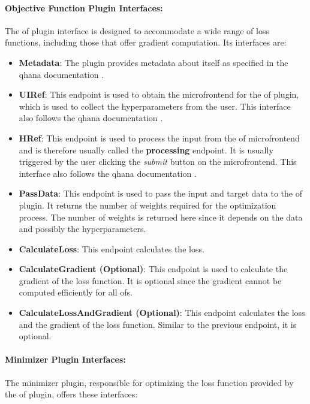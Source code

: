 \documentclass[
  a4paper,  %
  twoside,  %
  bibliography=totoc,
  headsepline,
  cleardoublepage=empty,
  parskip=half,
  draft=false
]{scrbook}
\begin{document}
\paragraph{Objective Function Plugin Interfaces:}

The \gls{of} plugin interface is designed to accommodate a wide range of loss functions, including those that offer gradient computation.
Its interfaces are:

\begin{itemize}
\item \textbf{Metadata}: The plugin provides metadata about itself as specified in the \gls{qhana} documentation \cite{FabianBuehler}.
\item \textbf{UIRef}: This endpoint is used to obtain the microfrontend for the \gls{of} plugin, which is used to collect the hyperparameters from the user.
This interface also follows the \gls{qhana} documentation \cite{FabianBuehler}.
\item \textbf{HRef}: This endpoint is used to process the input from the \gls{of} microfrontend and is therefore usually called the \textbf{processing} endpoint.
It is usually triggered by the user clicking the \emph{submit} button on the microfrontend.
This interface also follows the \gls{qhana} documentation \cite{FabianBuehler}.
\item \textbf{PassData}: This endpoint is used to pass the input and target data to the \gls{of} plugin.
It returns the number of weights required for the optimization process.
The number of weights is returned here since it depends on the data and possibly the hyperparameters.
\item \textbf{CalculateLoss}: This endpoint calculates the loss.
\item \textbf{CalculateGradient (Optional)}: This endpoint is used to calculate the gradient of the loss function. It is optional since the gradient cannot be computed efficiently for all \glspl{of}.
\item \textbf{CalculateLossAndGradient (Optional)}: This endpoint calculates the loss and the gradient of the loss function. Similar to the previous endpoint, it is optional.
\end{itemize}

\paragraph{Minimizer Plugin Interfaces:}

The minimizer plugin, responsible for optimizing the loss function provided by the \gls{of} plugin, offers these interfaces:
\end{document}
